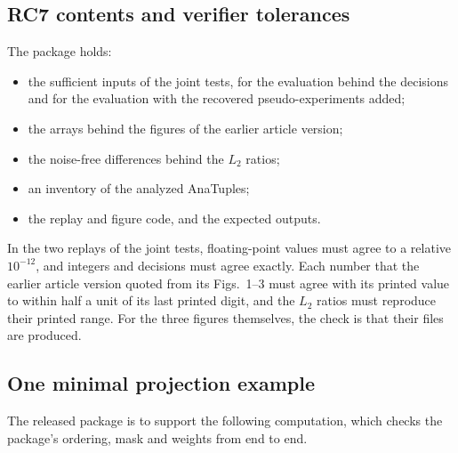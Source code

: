 \subsection{RC7 contents and verifier tolerances}

The package holds:
\begin{itemize}[nosep,leftmargin=2em]
  \item the sufficient inputs of the joint tests, for the evaluation behind the decisions and for the evaluation with the recovered pseudo-experiments added;
  \item the arrays behind the figures of the earlier article version;
  \item the noise-free differences behind the $L_2$ ratios;
  \item an inventory of the analyzed AnaTuples;
  \item the replay and figure code, and the expected outputs.
\end{itemize}
In the two replays of the joint tests, floating-point values must agree to a relative $10^{-12}$, and integers and decisions must agree exactly. Each number that the earlier article version quoted from its Figs.~1--3 must agree with its printed value to within half a unit of its last printed digit, and the $L_2$ ratios must reproduce their printed range. For the three figures themselves, the check is that their files are produced.

\subsection{One minimal projection example}
\label{app:release-example}

The released package is to support the following computation, which checks the package's ordering, mask and weights from end to end.

